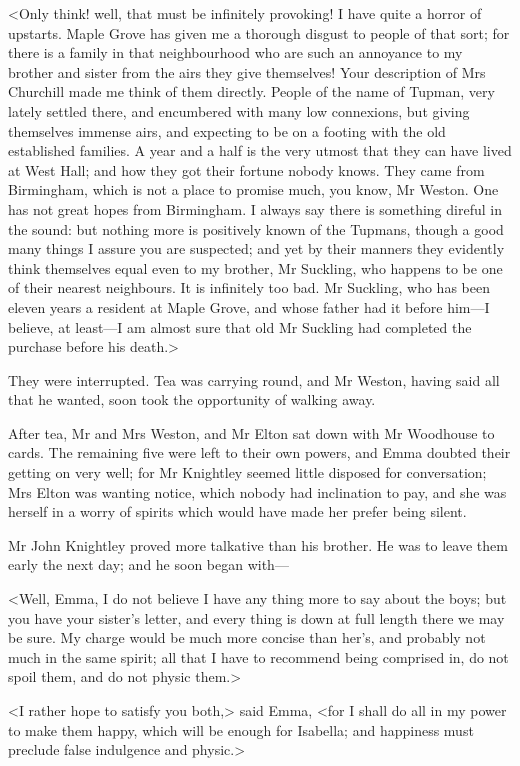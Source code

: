 <Only think! well, that must be infinitely provoking! I have quite a horror of upstarts. Maple Grove has given me a thorough disgust to people of that sort; for there is a family in that neighbourhood who are such an annoyance to my brother and sister from the airs they give themselves! Your description of Mrs Churchill made me think of them directly. People of the name of Tupman, very lately settled there, and encumbered with many low connexions, but giving themselves immense airs, and expecting to be on a footing with the old established families. A year and a half is the very utmost that they can have lived at West Hall; and how they got their fortune nobody knows. They came from Birmingham, which is not a place to promise much, you know, Mr Weston. One has not great hopes from Birmingham. I always say there is something direful in the sound: but nothing more is positively known of the Tupmans, though a good many things I assure you are suspected; and yet by their manners they evidently think themselves equal even to my brother, Mr Suckling, who happens to be one of their nearest neighbours. It is infinitely too bad. Mr Suckling, who has been eleven years a resident at Maple Grove, and whose father had it before him—I believe, at least—I am almost sure that old Mr Suckling had completed the purchase before his death.>

They were interrupted. Tea was carrying round, and Mr Weston, having said all that he wanted, soon took the opportunity of walking away.

After tea, Mr and Mrs Weston, and Mr Elton sat down with Mr Woodhouse to cards. The remaining five were left to their own powers, and Emma doubted their getting on very well; for Mr Knightley seemed little disposed for conversation; Mrs Elton was wanting notice, which nobody had inclination to pay, and she was herself in a worry of spirits which would have made her prefer being silent.

Mr John Knightley proved more talkative than his brother. He was to leave them early the next day; and he soon began with—

<Well, Emma, I do not believe I have any thing more to say about the boys; but you have your sister's letter, and every thing is down at full length there we may be sure. My charge would be much more concise than her's, and probably not much in the same spirit; all that I have to recommend being comprised in, do not spoil them, and do not physic them.>

<I rather hope to satisfy you both,> said Emma, <for I shall do all in my power to make them happy, which will be enough for Isabella; and happiness must preclude false indulgence and physic.>

